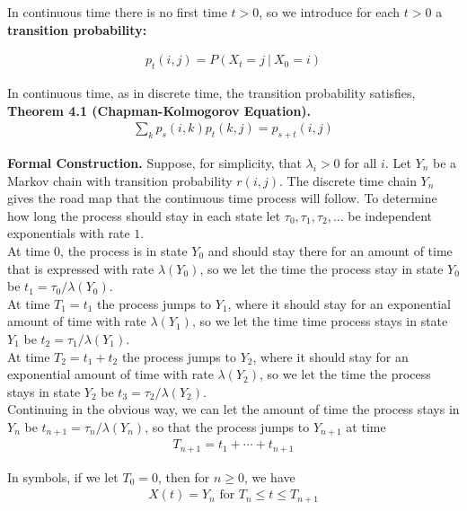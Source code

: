 \documentclass[12pt]{article}
\begin{document}
In continuous time there is no first time $t > 0$, so we introduce for each $t > 0$ a \textbf{transition probability:}

\begin{align*}
p_t(i, j) = P(X_t = j \ | \ X_0 = i)
\end{align*}

In continuous time, as in discrete time, the transition probability satisfies,\\

\textbf{Theorem 4.1 (Chapman-Kolmogorov Equation).} 
\begin{align*}
\sum_k p_s(i,k)p_t(k, j) = p_{s+t}(i, j)
\end{align*}

\textbf{Formal Construction.} Suppose, for simplicity, that $\lambda_i > 0$ for all $i$. Let $Y_n$ be a Markov chain with transition probability $r(i, j)$. The discrete time chain $Y_n$ gives the road map that the continuous time process will follow. To determine how long the process should stay in each state let $\tau_0, \tau_1, \tau_2, \ldots$ be independent exponentials with rate $1$.\\

At time $0$, the process is in state $Y_0$ and should stay there for an amount of time that is expressed with rate $\lambda(Y_0)$, so we let the time the process stay in state $Y_0$ be $t_1 = \tau_0/\lambda(Y_0)$.\\

At time $T_1 = t_1$ the process jumps to $Y_1$, where it should stay for an exponential amount of time with rate $\lambda(Y_1)$, so we let the time time process stays in state $Y_1$ be $t_2 = \tau_1/\lambda(Y_1)$.\\

At time $T_2 = t_1 + t_2$ the process jumps to $Y_2$, where it should stay for an exponential amount of time with rate $\lambda(Y_2)$, so we let the time the process stays in state $Y_2$ be $t_3 = \tau_2/\lambda(Y_2)$.\\

Continuing in the obvious way, we can let the amount of time the process stays in $Y_n$ be $t_{n+1} = \tau_n/\lambda(Y_n)$, so that the process jumps to $Y_{n+1}$ at time
\begin{align*}
T_{n+1} = t_1 + \cdots + t_{n+1}
\end{align*}

In symbols, if we let $T_0 = 0$, then for $n \geq 0$, we have
\begin{align*}
X(t) = Y_n \text{    for } T_n \leq t \leq T_{n+1}
\end{align*}
\end{document}
